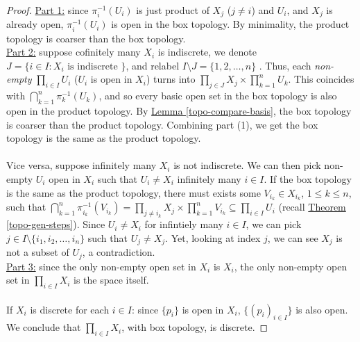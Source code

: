 \documentclass{treatise}
\begin{document}
\begin{proof}
\underline{Part 1:} since $\pi_i^{-1}(U_i)$ is just product of $X_j$ ($j \neq i$) and $U_i$, and $X_j$ is already open, $\pi_i^{-1}(U_i)$ is open in the box topology. By minimality, the product topology is coarser than the box topology.
\\
\underline{Part 2:} suppose cofinitely many $X_i$ is indiscrete, we denote $J = \{ i \in I : X_i \mbox{ is indiscrete } \}$, and relabel $I \setminus J = \{ 1, 2, \hdots, n \}$ . Thus, each \textit{non-empty} $\prod_{i \in I} U_i$ ($U_i$ is open in $X_i$) turns into $\prod_{j \in J} X_j \times \prod_{k = 1}^n U_k$. This coincides with $\bigcap_{k = 1}^n \pi_k^{-1}(U_k)$, and so every basic open set in the box topology is also open in the product topology. By \hyperref[topo-compare-basis]{Lemma \ref*{topo-compare-basis}}, the box topology is coarser than the product topology. Combining part (1), we get the box topology is the same as the product topology.
\\
\\
Vice versa, suppose infinitely many $X_i$ is not indiscrete. We can then pick non-empty $U_i$ open in $X_i$ such that $U_i \neq X_i$ infinitely many $i \in I$. If the box topology is the same as the product topology, there must exists some $V_{i_k} \in X_{i_k}$, $1 \leq k \leq n$, such that $\bigcap_{k = 1}^n \pi_{i_k}^{-1} (V_{i_k}) = \prod_{j \neq i_k} X_j \times \prod_{k = 1}^n V_{i_k} \subseteq \prod_{i \in I} U_i$ (recall \hyperref[topo-gen-steps]{Theorem \ref*{topo-gen-steps}}). Since $U_i \neq X_i$ for infintiely many $i \in I$, we can pick $j \in I \setminus \{ i_1, i_2, \hdots, i_n \}$ such that $U_j \neq X_j$. Yet, looking at index $j$, we can see $X_j$ is not a subset of $U_j$, a contradiction.
\\
\underline{Part 3:} since the only non-empty open set in $X_i$ is $X_i$, the only non-empty open set in $\prod_{i \in I} X_i$ is the space itself.
\\
\\
If $X_i$ is discrete for each $i \in I$: since $\{ p_i \}$ is open in $X_i$, $\{ (p_i)_{i \in I} \}$ is also open. We conclude that $\prod_{i \in I} X_i$, with box topology, is discrete.
\end{proof}
\end{document}
